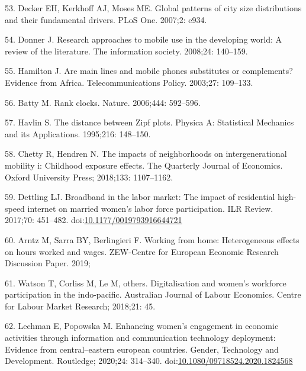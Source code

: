 \documentclass[10pt,letterpaper]{article}
\begin{document}
\leavevmode\hypertarget{ref-decker_global_2007}{}%
53. Decker EH, Kerkhoff AJ, Moses ME. Global patterns of city size
distributions and their fundamental drivers. PLoS One. 2007;2: e934.

\leavevmode\hypertarget{ref-donner_research_2008}{}%
54. Donner J. Research approaches to mobile use in the developing world:
A review of the literature. The information society. 2008;24: 140--159.

\leavevmode\hypertarget{ref-hamilton_are_2003}{}%
55. Hamilton J. Are main lines and mobile phones substitutes or
complements? Evidence from Africa. Telecommunications Policy. 2003;27:
109--133.

\leavevmode\hypertarget{ref-batty_rank_2006}{}%
56. Batty M. Rank clocks. Nature. 2006;444: 592--596.

\leavevmode\hypertarget{ref-havlin_distance_1995}{}%
57. Havlin S. The distance between Zipf plots. Physica A: Statistical
Mechanics and its Applications. 1995;216: 148--150.

\leavevmode\hypertarget{ref-chetty2018impacts}{}%
58. Chetty R, Hendren N. The impacts of neighborhoods on
intergenerational mobility i: Childhood exposure effects. The Quarterly
Journal of Economics. Oxford University Press; 2018;133: 1107--1162.

\leavevmode\hypertarget{ref-dettling2017}{}%
59. Dettling LJ. Broadband in the labor market: The impact of
residential high-speed internet on married women's labor force
participation. ILR Review. 2017;70: 451--482.
doi:\href{https://doi.org/10.1177/0019793916644721}{10.1177/0019793916644721}

\leavevmode\hypertarget{ref-arntz2019working}{}%
60. Arntz M, Sarra BY, Berlingieri F. Working from home: Heterogeneous
effects on hours worked and wages. ZEW-Centre for European Economic
Research Discussion Paper. 2019;

\leavevmode\hypertarget{ref-watson2018digitalisation}{}%
61. Watson T, Corliss M, Le M, others. Digitalisation and women's
workforce participation in the indo-pacific. Australian Journal of
Labour Economics. Centre for Labour Market Research; 2018;21: 45.

\leavevmode\hypertarget{ref-Lechman2020}{}%
62. Lechman E, Popowska M. Enhancing women's engagement in economic
activities through information and communication technology deployment:
Evidence from central--eastern european countries. Gender, Technology
and Development. Routledge; 2020;24: 314--340.
doi:\href{https://doi.org/10.1080/09718524.2020.1824568}{10.1080/09718524.2020.1824568}
\end{document}

